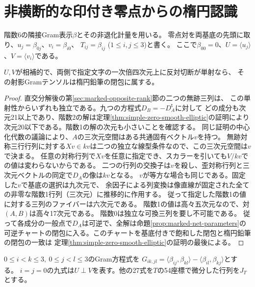 \section{非横断的な印付き零点からの楕円認識}
\label{sec:marked-gram-smoothing}
階数6の隣接Gram表示$\beta$とその非退化計量を用いる。
零点対を両基底の先頭に取り、$u_j=\beta_{0j}$、$v_i=\beta_{i0}$、
$T_{ij}=\beta_{ij}$ ($1\le i,j\le3$)と書く。
ここで$\beta_{00}=0$、$U=\langle u_j\rangle$、$V=\langle v_i\rangle$である。

\begin{lemma}[単純な印の三行列系の閉包]\label{lem:independent-marked-closure}
$U,V$が相補的で、両側で指定文字の一次倍四次元上に反対切断が単射なら、
その射影Gramテンソルは楕円鉛筆の閉包に属する。
\end{lemma}
\begin{proof}
直交分解後の第\ref{sec:marked-opposite-rank}節の二つの無跡三列は、
この単射性からいずれも独立である。九つの方程式$D_B=-D_A^{\mathsf t}$に対して
どの成分も次元21以上であり、階数2の解は定理\ref{thm:simple-zero-smooth-elliptic}の証明により
次元20以下である。階数1の解の次元も小さいことを確認する。
同じ証明の中心化代数の議論により、$A$の三次元空間はある共通固有ベクトル$v$を持つ。
無跡対称三行行列に対する$Xv\in kv$は二つの独立な線型条件なので、この三次元空間は$v$で決まる。
任意の対称行列で$Xv$を任意に指定でき、スカラーを引いても$V/kv$での値は変わらないからである。
二つの行列の交換子は$v$を殺し、歪対称行列と三次元ベクトルの同定で$D_A$の像は$kv$となる。
$v$が等方な場合も同じである。固定した$v$で基底の選択は九次元で、
余因子による列変換は像直線が固定された全ての非零な階数1行列（三次元）に推移的に作用する。
従って指定した階数1の値に対する三列のファイバーは六次元である。
階数1の値は高々五次元なので、対$(A,B)$は高々17次元である。
階数0は独立な可換三列を要し不可能である。
従って各成分の一般点で$D_A$は可逆で、全解は命題\ref{prop:marked-net-parameters}の
可逆チャートの閉包に入る。このチャートを基底付きで飽和した閉包と楕円鉛筆の閉包の一致は
定理\ref{thm:simple-zero-smooth-elliptic}の証明の最後による。
\end{proof}

$0\le i<k\le3,\ 0\le j<l\le3$のGram方程式を
$G_{ik,jl}=\langle\beta_{ij},\beta_{kl}\rangle-\langle\beta_{il},\beta_{kj}\rangle$とする。
$i=j=0$の九式は$U\perp V$を表す。他の27式を$T$の54座標で微分した行列を$J_T$とする。

